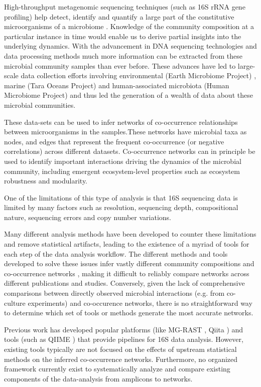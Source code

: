   High-throughput metagenomic sequencing techniques (such as 16S rRNA gene profiling) help detect, identify and quantify a large part of the constitutive microorganisms of a microbiome \cite{Jovel2016}.
  Knowledge of the community composition at a particular instance in time would enable us to derive partial insights into the underlying dynamics.
  With the advancement in DNA sequencing technologies \cite{Narihiro2017} and data processing methods much more information can be extracted from these microbial community samples than ever before.
  These advances have led to large-scale data collection efforts involving environmental (Earth Microbiome Project) \cite{Thompson2017}, marine (Tara Oceans Project) \cite{Zhang2015} and human-associated microbiota (Human Microbiome Project) \cite{HumanMicrobiomeProjectConsortium2012} and thus led the generation of a wealth of data about these microbial communities.
  
  These data-sets can be used to infer networks of co-occurrence relationships between microorganisms in the samples.These networks have microbial taxa as nodes, and edges that represent the frequent co-occurrence (or negative correlations) across different datasets. Co-occurrence networks can in principle be used to identify important interactions driving the dynamics of the microbial community, including emergent ecosystem-level properties such as ecosystem robustness and modularity.

  One of the limitations of this type of analysis is that 16S sequencing data is limited by many factors such as resolution, sequencing depth, compositional nature, sequencing errors and copy number variations.

  Many different analysis methods have been developed \cite{Callahan2016,Amir2017,Friedman2012,Kurtz2015} to counter these limitations and remove statistical artifacts, leading to the existence of a myriad of tools for each step of the data analysis workflow.
  The different methods and tools developed to solve these issues infer vastly different community compositions and co-occurrence networks \cite{Golob2017,Weiss2016}, making it difficult to reliably compare networks across different publications and studies. Conversely, given the lack of comprehensive comparisons between directly observed microbial interactions (e.g. from co-culture experiments) and co-occurence networks, there is no straightforward way to determine which set of tools or methods generate the most accurate networks.
  
 Previous work has developed popular platforms (like MG-RAST \cite{Keegan2016}, Qiita \cite{qiita}) and tools (such as QIIME \cite{Caporaso2010}) that provide pipelines for 16S data analysis. However, existing tools typically are not focused on the effects of upstream statistical methods on the inferred co-occurrence networks. Furthermore, no organized framework currently exist to systematically analyze and compare existing components of the data-analysis from amplicons to networks.
  
